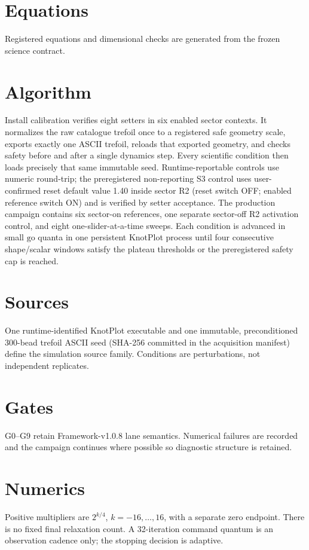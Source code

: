 \documentclass[11pt,a4paper]{article}
\begin{document}
\section{Equations}
Registered equations and dimensional checks are generated from the frozen science contract.
\section{Algorithm}
Install calibration verifies eight setters in six enabled sector contexts. It normalizes the raw catalogue trefoil once to a registered safe geometry scale, exports exactly one ASCII trefoil, reloads that exported geometry, and checks safety before and after a single dynamics step. Every scientific condition then loads precisely that same immutable seed. Runtime-reportable controls use numeric round-trip; the preregistered non-reporting S3 control uses user-confirmed reset default value 1.40 inside sector R2 (reset switch OFF; enabled reference switch ON) and is verified by setter acceptance. The production campaign contains six sector-on references, one separate sector-off R2 activation control, and eight one-slider-at-a-time sweeps. Each condition is advanced in small $\mathrm{go}$ quanta in one persistent KnotPlot process until four consecutive shape/scalar windows satisfy the plateau thresholds or the preregistered safety cap is reached.
\section{Sources}
One runtime-identified KnotPlot executable and one immutable, preconditioned 300-bead trefoil ASCII seed (SHA-256 committed in the acquisition manifest) define the simulation source family. Conditions are perturbations, not independent replicates.
\section{Gates}
G0--G9 retain Framework-v1.0.8 lane semantics. Numerical failures are recorded and the campaign continues where possible so diagnostic structure is retained.
\section{Numerics}
Positive multipliers are $2^{k/4}$, $k=-16,\ldots,16$, with a separate zero endpoint. There is no fixed final relaxation count. A 32-iteration command quantum is an observation cadence only; the stopping decision is adaptive.
\end{document}
